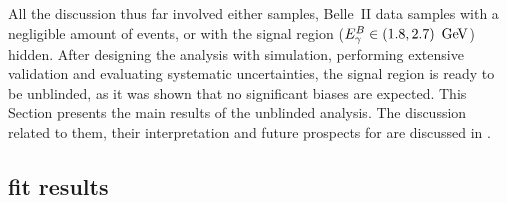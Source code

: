 All the discussion thus far involved either \MC samples, Belle~II data samples with a negligible amount of \BtoXsgamma events,
or with the signal region (${E^B_{\gamma}}\in(1.8,2.7)~\mathrm{\,Ge\kern -0.1em V}$) hidden.
After designing the analysis with simulation, performing extensive validation and evaluating systematic uncertainties, 
the signal region is ready to be unblinded, as it was shown that no significant biases are expected.
This Section presents the main results of the unblinded analysis.
The discussion related to them, their interpretation and future prospects for \BtoXsgamma are discussed in .

\subsection{\texorpdfstring{\Mbc}{Mbc} fit results}\label{sec:mbc_fit_results}

